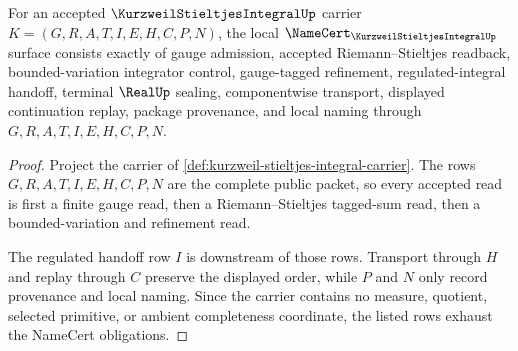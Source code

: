 \begin{theorem}
\label{thm:kurzweil-stieltjes-integral-namecert-obligations}
For an accepted $\KurzweilStieltjesIntegralUp$ carrier $K=(G,R,A,T,I,E,H,C,P,N)$, the local $\NameCert_{\KurzweilStieltjesIntegralUp}$ surface consists exactly of gauge admission, accepted Riemann--Stieltjes readback, bounded-variation integrator control, gauge-tagged refinement, regulated-integral handoff, terminal $\RealUp$ sealing, componentwise transport, displayed continuation replay, package provenance, and local naming through $G,R,A,T,I,E,H,C,P,N$.
\end{theorem}
\begin{proof}
Project the carrier of \autoref{def:kurzweil-stieltjes-integral-carrier}. The rows $G,R,A,T,I,E,H,C,P,N$ are the complete public packet, so every accepted read is first a finite gauge read, then a Riemann--Stieltjes tagged-sum read, then a bounded-variation and refinement read.

The regulated handoff row $I$ is downstream of those rows. Transport through $H$ and replay through $C$ preserve the displayed order, while $P$ and $N$ only record provenance and local naming. Since the carrier contains no measure, quotient, selected primitive, or ambient completeness coordinate, the listed rows exhaust the NameCert obligations.
\end{proof}

